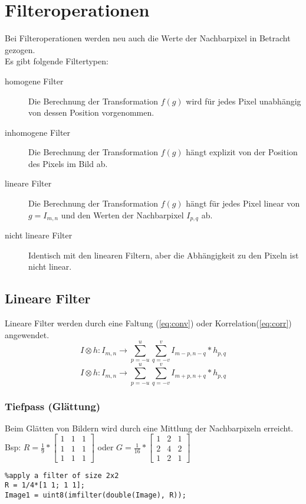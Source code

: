 \section{Filteroperationen}
Bei Filteroperationen werden neu auch die Werte der Nachbarpixel in Betracht gezogen.\\
Es gibt folgende Filtertypen:
\begin{description}
    \item[homogene Filter] Die Berechnung der Transformation $f(g)$ wird für jedes Pixel unabhängig von dessen Position vorgenommen.
    \item[inhomogene Filter] Die Berechnung der Transformation $f(g)$ hängt explizit von der Position des Pixels im Bild ab.
    \item[lineare Filter] Die Berechnung der Transformation $f(g)$ hängt für jedes Pixel linear von $g=I_{m,n}$ und den Werten der Nachbarpixel $I_{p,q}$ ab.
    \item [nicht lineare Filter] Identisch mit den linearen Filtern, aber die Abhängigkeit zu den Pixeln ist nicht linear.
\end{description}

\subsection{Lineare Filter}
Lineare Filter werden durch eine Faltung (\ref{eq:conv}) oder Korrelation(\ref{eq:corr}) angewendet.
\begin{equation} \label{eq:conv}
I \otimes h: I_{m,n} \to \sum_{p=-u}^{u}\sum_{q=-v}^{v}I_{m-p,n-q} * h_{p,q}
\end{equation}
\begin{equation} \label{eq:corr}
I \otimes h: I_{m,n} \to \sum_{p=-u}^{u}\sum_{q=-v}^{v}I_{m+p,n+q} * h_{p,q}
\end{equation}
\subsubsection{Tiefpass (Glättung)}
Beim Glätten von Bildern wird durch eine Mittlung der Nachbarpixeln erreicht.\\
Bsp: $R=\frac{1}{9}*\begin{bmatrix}
1 & 1 & 1 \\
1 & 1 & 1 \\
1 & 1 & 1
\end{bmatrix}$
oder $G=\frac{1}{16}*\begin{bmatrix}
1 & 2 & 1 \\
2 & 4 & 2 \\
1 & 2 & 1
\end{bmatrix}$
\begin{lstlisting}
%apply a filter of size 2x2
R = 1/4*[1 1; 1 1];
Image1 = uint8(imfilter(double(Image), R));
\end{lstlisting}
